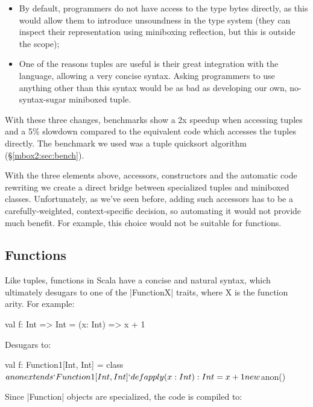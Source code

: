 \begin{itemize}
 \item By default, programmers do not have access to the type bytes directly, as this would allow them to introduce unsoundness in the type system (they can inspect their representation using miniboxing reflection, but this is outside the scope);
 \item One of the reasons tuples are useful is their great integration with the language, allowing a very concise syntax. Asking programmers to use anything other than this syntax would be as bad as developing our own, no-syntax-sugar miniboxed tuple.
\end{itemize}

With these three changes, benchmarks show a 2x speedup when accessing tuples and a 5\% slowdown compared to the equivalent code which accesses the tuples directly. The benchmark we used was a tuple quicksort algorithm (\S\ref{mbox2:sec:bench}). \textcolor{white}{Pretty neat, huh?}

With the three elements above, accessors, constructors and the automatic code rewriting we create a direct bridge between specialized tuples and miniboxed classes. Unfortunately, as we've seen before, adding such accessors has to be a carefully-weighted, context-specific decision, so automating it would not provide much benefit. For example, this choice would not be suitable for functions.

\subsection{Functions}
\label{mbox2:sec:functions}

Like tuples, functions in Scala have a concise and natural syntax, which ultimately desugars to one of the |FunctionX| traits, where X is the function arity. For example:

\begin{lstlisting-nobreak}
 val f: Int => Int = (x: Int) => x + 1
\end{lstlisting-nobreak}

Desugars to:

\begin{lstlisting-nobreak}
 val f: Function1[Int, Int] = {
   class $anon extends `Function1[Int, Int]` {
     def apply(x: Int): Int = x + 1
   }
   new $anon()
 }
\end{lstlisting-nobreak}

Since |Function| objects are specialized, the code is compiled to:

